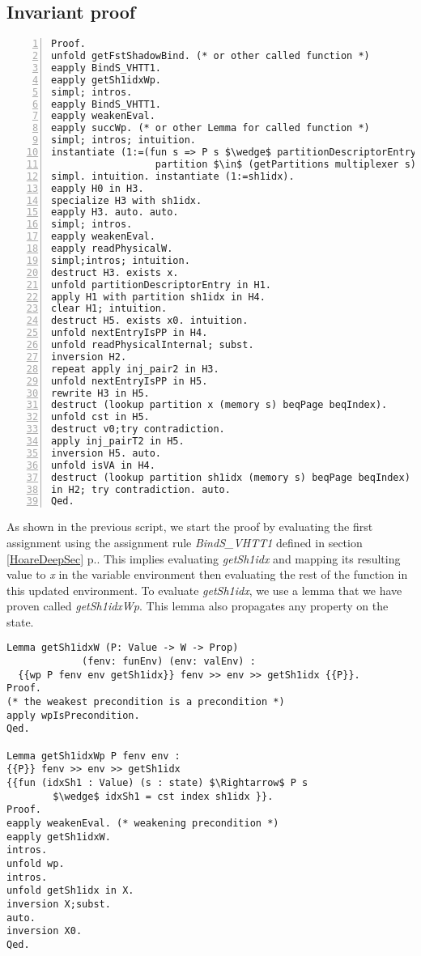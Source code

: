 \subsection{Invariant proof} \label{proof}
\begin{lstlisting}[caption = {Proof of the getFstShadow invariant},xleftmargin=-.08\textwidth,
xrightmargin=-.08\textwidth,mathescape=true,numbers=left]
Proof.
unfold getFstShadowBind. (* or other called function *)
eapply BindS_VHTT1.
eapply getSh1idxWp.
simpl; intros.
eapply BindS_VHTT1.
eapply weakenEval.
eapply succWp. (* or other Lemma for called function *)
simpl; intros; intuition.
instantiate (1:=(fun s => P s $\wedge$ partitionDescriptorEntry s $\wedge$ 
                  partition $\in$ (getPartitions multiplexer s))).
simpl. intuition. instantiate (1:=sh1idx).
eapply H0 in H3.
specialize H3 with sh1idx.
eapply H3. auto. auto.
simpl; intros.
eapply weakenEval.
eapply readPhysicalW.
simpl;intros; intuition.
destruct H3. exists x.
unfold partitionDescriptorEntry in H1.
apply H1 with partition sh1idx in H4.
clear H1; intuition.
destruct H5. exists x0. intuition.
unfold nextEntryIsPP in H4.
unfold readPhysicalInternal; subst.
inversion H2.
repeat apply inj_pair2 in H3.
unfold nextEntryIsPP in H5.
rewrite H3 in H5.
destruct (lookup partition x (memory s) beqPage beqIndex).
unfold cst in H5.
destruct v0;try contradiction.
apply inj_pairT2 in H5.
inversion H5. auto.
unfold isVA in H4.
destruct (lookup partition sh1idx (memory s) beqPage beqIndex) 
in H2; try contradiction. auto.
Qed.
\end{lstlisting} 
As shown in the previous script, we start the proof by evaluating the first assignment using the assignment rule \textit{BindS\_VHTT1} defined in section \ref{HoareDeepSec} p.\pageref{HoareDeepSec}. This implies evaluating \textit{getSh1idx} and mapping its resulting value to \textit{x} in the variable environment then evaluating the rest of the function in this updated environment. To evaluate \textit{getSh1idx}, we use a lemma that we have proven called \textit{getSh1idxWp}. This lemma also propagates any property on the state.
\begin{lstlisting}[caption = {getSh1idxWp lemma definition and proof},xleftmargin=-.06\textwidth,
xrightmargin=-.06\textwidth,mathescape=true]
Lemma getSh1idxW (P: Value -> W -> Prop) 
	         (fenv: funEnv) (env: valEnv) :
  {{wp P fenv env getSh1idx}} fenv >> env >> getSh1idx {{P}}.
Proof.
(* the weakest precondition is a precondition *)
apply wpIsPrecondition.
Qed.

Lemma getSh1idxWp P fenv env :
{{P}} fenv >> env >> getSh1idx 
{{fun (idxSh1 : Value) (s : state) $\Rightarrow$ P s  
	    $\wedge$ idxSh1 = cst index sh1idx }}.
Proof.
eapply weakenEval. (* weakening precondition *)
eapply getSh1idxW.
intros. 
unfold wp.
intros.
unfold getSh1idx in X.
inversion X;subst.
auto.
inversion X0.
Qed. 
\end{lstlisting} \vspace{4pt}

